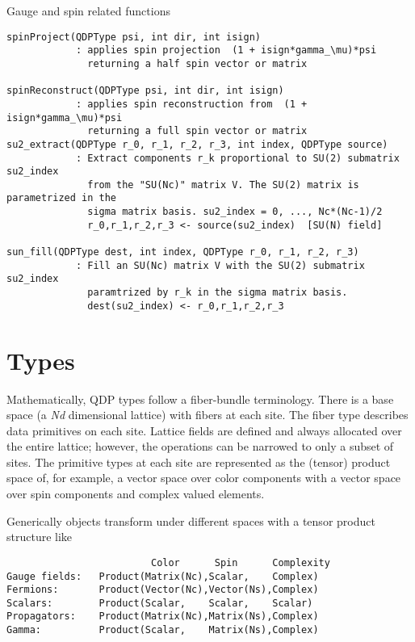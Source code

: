 \documentclass[12pt,letterpaper]{article}
\begin{document}
Gauge and spin related functions

\begin{verbatim}
spinProject(QDPType psi, int dir, int isign)
		    : applies spin projection  (1 + isign*gamma_\mu)*psi
		      returning a half spin vector or matrix

spinReconstruct(QDPType psi, int dir, int isign)
		    : applies spin reconstruction from  (1 + isign*gamma_\mu)*psi
		      returning a full spin vector or matrix
su2_extract(QDPType r_0, r_1, r_2, r_3, int index, QDPType source)
		    : Extract components r_k proportional to SU(2) submatrix su2_index
		      from the "SU(Nc)" matrix V. The SU(2) matrix is parametrized in the
		      sigma matrix basis. su2_index = 0, ..., Nc*(Nc-1)/2
		      r_0,r_1,r_2,r_3 <- source(su2_index)  [SU(N) field]

sun_fill(QDPType dest, int index, QDPType r_0, r_1, r_2, r_3)
		    : Fill an SU(Nc) matrix V with the SU(2) submatrix su2_index
		      paramtrized by r_k in the sigma matrix basis.
		      dest(su2_index) <- r_0,r_1,r_2,r_3
\end{verbatim}

\bigskip


\newpage
\section{Types}

Mathematically, QDP types follow a fiber-bundle terminology.  There is
a base space (a {\em Nd} dimensional lattice) with fibers at each site.  The
fiber type describes data primitives on each site.  Lattice fields are
defined and always allocated over the entire lattice; however, the
operations can be narrowed to only a subset of sites.  The primitive
types at each site are represented as the (tensor) product space of,
for example, a vector space over color components with a vector space
over spin components and complex valued elements.

Generically objects transform under different spaces with a tensor
product structure like

\begin{verbatim}
                         Color      Spin      Complexity
Gauge fields:   Product(Matrix(Nc),Scalar,    Complex)
Fermions:       Product(Vector(Nc),Vector(Ns),Complex)
Scalars:        Product(Scalar,    Scalar,    Scalar)
Propagators:    Product(Matrix(Nc),Matrix(Ns),Complex)
Gamma:          Product(Scalar,    Matrix(Ns),Complex)
\end{verbatim}
\end{document}
